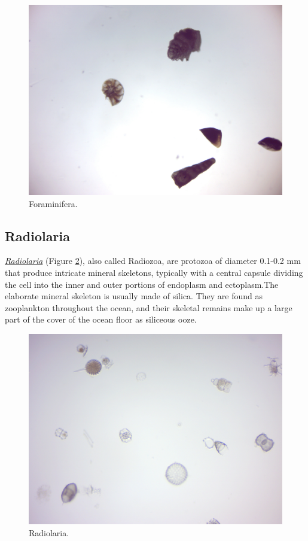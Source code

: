 \begin{figure}

{\centering \includegraphics[width=0.7\linewidth]{./figures/protists/foraminifera}

}

\caption{Foraminifera.}\label{fig:foraminifera}
\end{figure}

\subsection{Radiolaria}\label{radiolaria}

\href{https://en.wikipedia.org/wiki/Radiolaria}{\emph{Radiolaria}}
(Figure \ref{fig:radiolaria}), also called Radiozoa, are protozoa of
diameter 0.1-0.2 mm that produce intricate mineral skeletons, typically
with a central capsule dividing the cell into the inner and outer
portions of endoplasm and ectoplasm.The elaborate mineral skeleton is
usually made of silica. They are found as zooplankton throughout the
ocean, and their skeletal remains make up a large part of the cover of
the ocean floor as siliceous ooze.

\begin{figure}

{\centering \includegraphics[width=0.7\linewidth]{./figures/protists/radiolaria}

}

\caption{Radiolaria.}\label{fig:radiolaria}
\end{figure}

